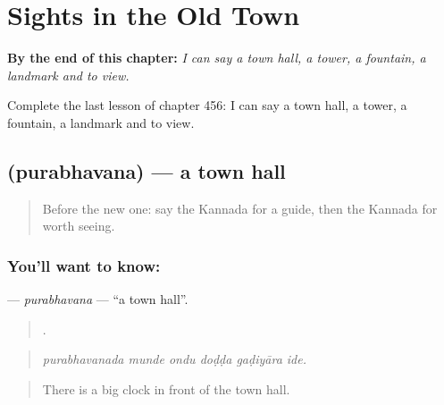 
\chapter{Sights in the Old Town}
\label{ch:ka-sights-in-the-old-town}

\begin{chapteropening}
\textbf{By the end of this chapter:} \emph{I can say a town hall, a tower, a fountain, a landmark and to view.}

Complete the last lesson of chapter 456: I can say a town hall, a tower, a fountain, a landmark and to view.
\end{chapteropening}

\section[\texorpdfstring{\kn{ಪುರಭವನ} (purabhavana)}{ಪುರಭವನ (purabhavana)}]{ (purabhavana) — a town hall}

\label{lesson:KA-C456-purabhavana}



\begin{quote}
Before the new one: say the Kannada for a guide, then the Kannada for worth seeing.
\end{quote}

\subsection*{You'll want to know: }
\textbf{} — \emph{purabhavana} — \textquotedblleft{}a town hall\textquotedblright{}.

\begin{quote}
     .
\end{quote}

\begin{quote}
\emph{purabhavanada munde ondu doḍḍa gaḍiyāra ide.}
\end{quote}

\begin{quote}
There is a big clock in front of the town hall.
\end{quote}

